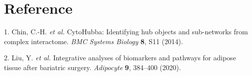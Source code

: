 \documentclass[
]{article}
\newenvironment{cslreferences}%
  {}%
  {\par}
\begin{document}
\hypertarget{bibliography}{%
\section*{Reference}\label{bibliography}}

\hypertarget{refs}{}
\begin{cslreferences}
\leavevmode\hypertarget{ref-CytohubbaIdenChin2014}{}%
1. Chin, C.-H. \emph{et al.} CytoHubba: Identifying hub objects and sub-networks from complex interactome. \emph{BMC Systems Biology} \textbf{8}, S11 (2014).

\leavevmode\hypertarget{ref-IntegrativeAnaLiuY2020}{}%
2. Liu, Y. \emph{et al.} Integrative analyses of biomarkers and pathways for adipose tissue after bariatric surgery. \emph{Adipocyte} \textbf{9}, 384--400 (2020).
\end{cslreferences}
\end{document}
